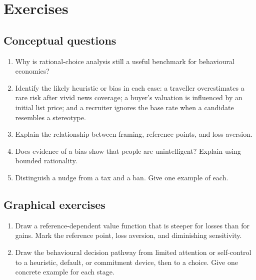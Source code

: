 \section*{Exercises}

\subsection*{Conceptual questions}
\begin{enumerate}[label=\arabic*.]
  \item Why is rational-choice analysis still a useful benchmark for behavioural economics?
  \item Identify the likely heuristic or bias in each case: a traveller overestimates a rare risk after vivid news coverage; a buyer's valuation is influenced by an initial list price; and a recruiter ignores the base rate when a candidate resembles a stereotype.
  \item Explain the relationship between framing, reference points, and loss aversion.
  \item Does evidence of a bias show that people are unintelligent? Explain using bounded rationality.
  \item Distinguish a nudge from a tax and a ban. Give one example of each.
\end{enumerate}

\subsection*{Graphical exercises}
\begin{enumerate}[resume,label=\arabic*.]
  \item Draw a reference-dependent value function that is steeper for losses than for gains. Mark the reference point, loss aversion, and diminishing sensitivity.
  \item Draw the behavioural decision pathway from limited attention or self-control to a heuristic, default, or commitment device, then to a choice. Give one concrete example for each stage.
\end{enumerate}

